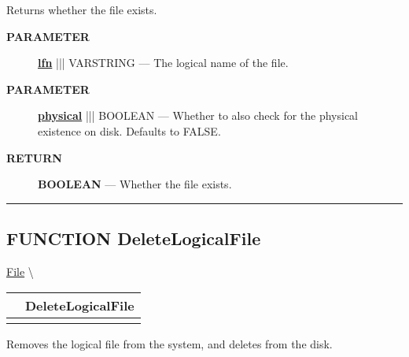Returns whether the file exists.






\par
\begin{description}
\item [\colorbox{tagtype}{\color{white} \textbf{\textsf{PARAMETER}}}] \textbf{\underline{lfn}} ||| VARSTRING --- The logical name of the file.
\item [\colorbox{tagtype}{\color{white} \textbf{\textsf{PARAMETER}}}] \textbf{\underline{physical}} ||| BOOLEAN --- Whether to also check for the physical existence on disk. Defaults to FALSE.
\end{description}







\par
\begin{description}
\item [\colorbox{tagtype}{\color{white} \textbf{\textsf{RETURN}}}] \textbf{BOOLEAN} --- Whether the file exists.
\end{description}




\rule{\linewidth}{0.5pt}
\subsection*{\textsf{\colorbox{headtoc}{\color{white} FUNCTION}
DeleteLogicalFile}}

\hypertarget{ecldoc:file.deletelogicalfile}{}
\hspace{0pt} \hyperlink{ecldoc:File}{File} \textbackslash 

{\renewcommand{\arraystretch}{1.5}
\begin{tabularx}{\textwidth}{|>{\raggedright\arraybackslash}l|X|}
\hline
\hspace{0pt}\mytexttt{\color{red} } & \textbf{DeleteLogicalFile} \\
\hline
\multicolumn{2}{|>{\raggedright\arraybackslash}X|}{\hspace{0pt}\mytexttt{\color{param} (varstring lfn, boolean allowMissing=FALSE)}} \\
\hline
\end{tabularx}
}

\par





Removes the logical file from the system, and deletes from the disk.






